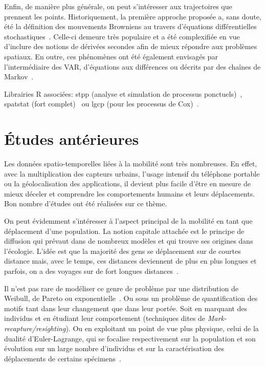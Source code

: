Enfin, de manière plus générale, on peut s'intéresser aux trajectoires que prennent les points. Historiquement, la première approche proposée a, sans doute, été la définition des mouvements Browniens au travers d'équations différentielles stochastiques~\cite{diggle2013statistical}. Celle-ci demeure très populaire et a été complexifiée en vue d'inclure des notions de dérivées secondes afin de mieux répondre aux problèmes spatiaux. En outre, ces phénomènes ont été également envisagés par l'intermédiaire des VAR, d'équations aux différences ou décrits par des chaînes de Markov~\cite{gelfand2010handbook}.

Librairies R associées: stpp (analyse et simulation de processus ponctuels)~\cite{gabriel2013stpp}, spatstat (fort complet)~\cite{baddeley2016spatial} ou lgcp (pour les processus de Cox)~\cite{lgcp}.

\section{Études antérieures}

Les données spatio-temporelles liées à la mobilité sont très nombreuses. En effet, avec la multiplication des capteurs urbains, l'usage intensif du téléphone portable ou la géolocalisation des applications, il devient plus facile d'être en mesure de mieux déceler et comprendre les comportements humains et leurs déplacements. Bon nombre d'études ont été réalisées sur ce thème.

On peut évidemment s'intéresser à l'aspect principal de la mobilité en tant que déplacement d'une population. La notion capitale attachée est le principe de diffusion qui prévaut dans de nombreux modèles et qui trouve ses origines dans l'écologie. L'idée est que la majorité des gens se déplacement sur de courtes distance mais, avec le temps, ces distances deviennent de plus en plus longues et parfois, on a des voyages sur de fort longues distances~\cite{brockmann2006scaling}.

Il n'est pas rare de modéliser ce genre de problème par une distribution de Weibull, de Pareto ou exponentielle~\cite{higgins1999predicting}. Ou sous un problème de quantification des motifs tant dans leur changement que dans leur portée. Soit en marquant des individus et en étudiant leur comportement (techniques dites de \textit{Mark-recapture/resighting}). Ou en exploitant un point de vue plus physique, celui de la dualité d'Euler-Lagrange, qui se focalise respectivement sur la population et son évolution sur un large nombre d'individus et sur la caractérisation des déplacements de certains spécimens~\cite{nathan2003methods, southwood2009ecological}.

